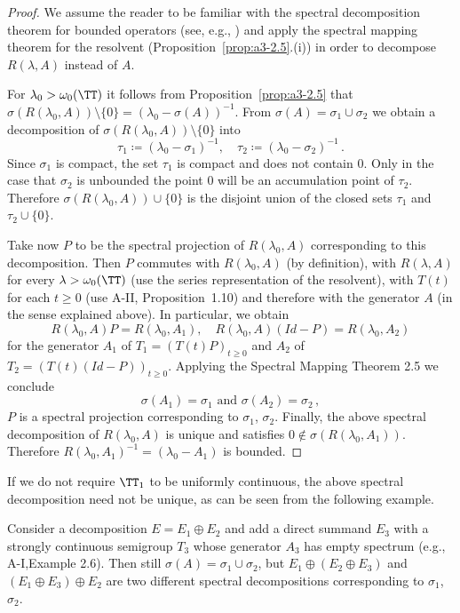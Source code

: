 \begin{proof}
We assume the reader to be familiar with the spectral decomposition theorem for bounded operators (see, e.g., \citet[p.572]{dunfordschwartz:1958}) and apply the spectral mapping theorem for the resolvent (Proposition~\ref{prop:a3-2.5}.(i)) in order to decompose $R(\lambda,A)$ instead of $A$.

For $\lambda_{0} > \omega_{0}(\TT)$ it follows from Proposition~\ref{prop:a3-2.5} that $\sigma(R(\lambda_{0},A)) \setminus \{0\} = (\lambda_{0} - \sigma(A))^{-1}$.
From $\sigma(A) = \sigma_{1} \cup \sigma_{2}$ we obtain a decomposition of $\sigma(R(\lambda_{0},A)) \setminus \{0\}$ into
\[
\tau_{1} \coloneqq (\lambda_{0}-\sigma_{1})^{-1}, \quad \tau_{2} \coloneqq (\lambda_{0}-\sigma_{2})^{-1}\,.
\]
Since $\sigma_{1}$ is compact, the set $\tau_{1}$ is compact and does not contain $0$.
Only in the case that $\sigma_{2}$ is unbounded the point $0$ will be an accumulation point of $\tau_{2}$.
Therefore $\sigma(R(\lambda_{0},A)) \cup \{0\}$ is the disjoint union of the closed sets $\tau_{1}$ and $\tau_{2} \cup \{0\}$.

Take now $P$ to be the spectral projection of $R(\lambda_{0},A)$ corresponding to this decomposition.
Then $P$ commutes with $R(\lambda_{0},A)$ (by definition), with $R(\lambda,A)$ for every $\lambda > \omega_{0}(\TT)$ (use the series representation of the resolvent), with $T(t)$ for each $t \geq 0$ (use A-II, Proposition~1.10) and therefore with the generator $A$ (in the sense explained above).
In particular, we obtain
\[
R(\lambda_{0},A)P = R(\lambda_{0},A_{1}), \quad R(\lambda_{0},A)(Id-P) = R(\lambda_{0},A_{2})
\]
for the generator $A_{1}$ of $T_{1} = (T(t)P)_{t \geq 0}$ and $A_{2}$ of $T_{2} = (T(t)(Id-P))_{t \geq 0}$.
Applying the Spectral Mapping Theorem 2.5 we conclude
\[
\sigma(A_{1}) = \sigma_{1} \text{ and } \sigma(A_{2}) = \sigma_{2}\,,
\]
\ie $P$ is a spectral projection corresponding to $\sigma_{1}$, $\sigma_{2}$.
Finally, the above spectral decomposition of $R(\lambda_{0},A)$ is unique and satisfies $0 \notin \sigma(R(\lambda_{0},A_{1}))$.
Therefore $R(\lambda_{0},A_{1})^{-1} = (\lambda_{0}-A_{1})$ is bounded.
\end{proof}
If we do not require $\TT_{1}$ to be uniformly continuous, the above spectral decomposition need not be unique, as can be seen from the following example. 

Consider a decomposition $E = E_{1} \oplus E_{2}$ and add a direct summand $E_{3}$ with a strongly continuous semigroup $T_{3}$ whose generator $A_{3}$ has empty spectrum (e.g., A-I,Example 2.6).
Then still $\sigma(A) = \sigma_{1} \cup \sigma_{2}$, but $E_{1} \oplus (E_{2} \oplus E_{3})$ and $(E_{1} \oplus E_{3}) \oplus E_{2}$ are two different spectral decompositions corresponding to $\sigma_{1}$, $\sigma_{2}$.


